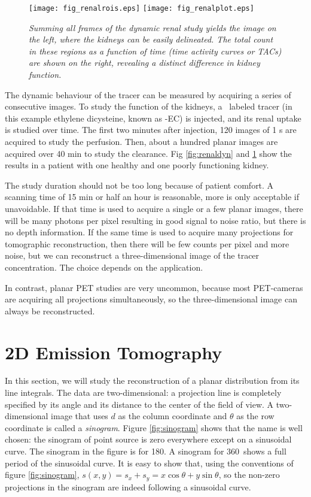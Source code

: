 \begin{figure}[tb]
\centering
\texttt{[image: fig\_renalrois.eps]}
  \texttt{[image: fig\_renalplot.eps]}
\caption{\label{fig:renalroi} \emph{Summing all frames of the dynamic
    renal study yields the image on the left, where the kidneys can be
    easily delineated. The total count in these regions as a function
    of time (time activity curves or TACs) are shown on the right,
    revealing a distinct difference in kidney function.}}
\end{figure}

The dynamic behaviour of the tracer can be measured by acquiring a
series of consecutive images. To study the function of the kidneys, a
\Tc\ labeled tracer (in this example ethylene dicysteine, known
as \Tc-EC) is injected, and its renal uptake is studied over
time. The first two minutes after injection, 120 images of 1 s are
acquired to study the perfusion. Then, about a hundred planar images
are acquired over 40 min to study the clearance. Fig
\ref{fig:renaldyn} and \ref{fig:renalroi} show the results in a
patient with one healthy and one poorly functioning kidney.

The study duration should not be too long because of patient
comfort. A scanning time of 15 min or half an hour is reasonable, more
is only acceptable if unavoidable. If that time is used to acquire a
single or a few planar images, there will be many photons per pixel
resulting in good signal to noise ratio, but there is no depth
information.  If the same time is used to acquire many projections for
tomographic reconstruction, then there will be few counts per pixel
and more noise, but we can reconstruct a three-dimensional image of
the tracer concentration. The choice depends on the application.

In contrast, planar PET studies are very uncommon, because most PET-cameras
are acquiring all projections simultaneously, so the three-dimensional image
can always be reconstructed.

\section{2D Emission Tomography}

In this section, we will study the reconstruction of a planar distribution
from its line integrals. The data are two-dimensional: a projection line is
completely specified by its angle and its distance to the center of the field
of view. A two-dimensional image that uses $d$ as the column coordinate and
$\theta$ as the row coordinate is called a {\em sinogram}. Figure
\ref{fig:sinogram} shows that the name is well chosen: the sinogram of point
source is zero everywhere except on a sinusoidal curve. The sinogram in the
figure is for 180\degrees. A sinogram for 360\degrees\ shows a full period of
the sinusoidal curve. It is easy to show that, using the conventions of figure
\ref{fig:sinogram}, $s(x,y) = s_x + s_y = x \cos \theta + y \sin \theta$, so
the non-zero projections in the sinogram are indeed following a sinusoidal
curve.

